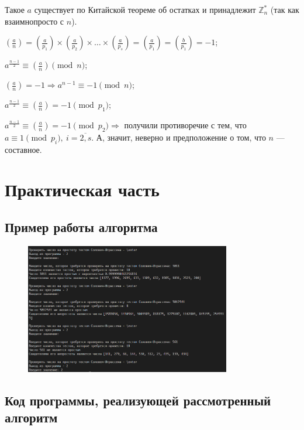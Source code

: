 \documentclass[bachelor, och, labwork]{shiza}
\begin{document}
Такое $a$ существует по Китайской теореме об остатках и принадлежит $\mathbb{Z}^*_n$
(так как взаимнопросто с $n$).

$\left(\frac{a}{n}\right)=\left(\frac{a}{p_1}\right)\times\left(\frac{a}{p_2}\right)\times\ldots\times\left(\frac{a}{p_s}\right) = \left(\frac{a}{p_1}\right)=\left(\frac{b}{p_1}\right)=-1$;

$a ^{\frac{n-1}{2}}\equiv\left(\frac{a}{n}\right) \pmod n$;

$\left(\frac{a}{n}\right)=-1\Rightarrow a^{n-1}\equiv -1 \pmod{n}$;

$a^{\frac{n-1}{2}} \equiv \left(\frac{a}{n}\right) = -1 \pmod{p_1}$;

$a ^ {\frac{n-1}{2}} \equiv \left(\frac{a}{n}\right)= -1 \pmod{p_2} \Rightarrow$
получили противоречие с тем, что $a\equiv 1 \pmod{p_i}, ~i=\overline{2,s}$. А, 
значит, неверно и предположение о том, что $n$ --- составное.


\section{Практическая часть}
\subsection{Пример работы алгоритма}
\begin{figure}[H]
    \centering
    \includegraphics[width=0.8\textwidth]{pic1.png}
    \caption{}
\end{figure}

    \subsection{Код программы, реализующей рассмотренный алгоритм}
        \inputminted{python}{lab6.py}
\end{document}
